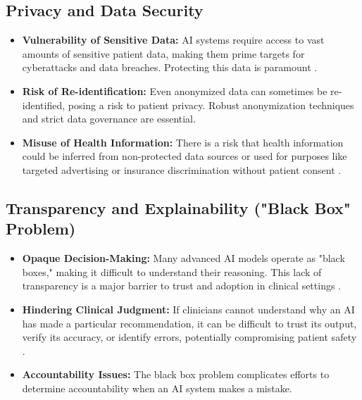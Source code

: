 \subsection{Privacy and Data Security}
\begin{itemize}
    \item \textbf{Vulnerability of Sensitive Data:} AI systems require access to vast amounts of sensitive patient data, making them prime targets for cyberattacks and data breaches. Protecting this data is paramount \cite{NIH_AlgorithmicBias}.
    \item \textbf{Risk of Re-identification:} Even anonymized data can sometimes be re-identified, posing a risk to patient privacy. Robust anonymization techniques and strict data governance are essential.
    \item \textbf{Misuse of Health Information:} There is a risk that health information could be inferred from non-protected data sources or used for purposes like targeted advertising or insurance discrimination without patient consent \cite{Prineos_PrivacySecurity}.
\end{itemize}

\subsection{Transparency and Explainability ("Black Box" Problem)}
\begin{itemize}
    \item \textbf{Opaque Decision-Making:} Many advanced AI models operate as "black boxes," making it difficult to understand their reasoning. This lack of transparency is a major barrier to trust and adoption in clinical settings \cite{Medpro_BlackBox}.
    \item \textbf{Hindering Clinical Judgment:} If clinicians cannot understand why an AI has made a particular recommendation, it can be difficult to trust its output, verify its accuracy, or identify errors, potentially compromising patient safety \cite{NIH_AlgorithmicBias}.
    \item \textbf{Accountability Issues:} The black box problem complicates efforts to determine accountability when an AI system makes a mistake.
\end{itemize}

